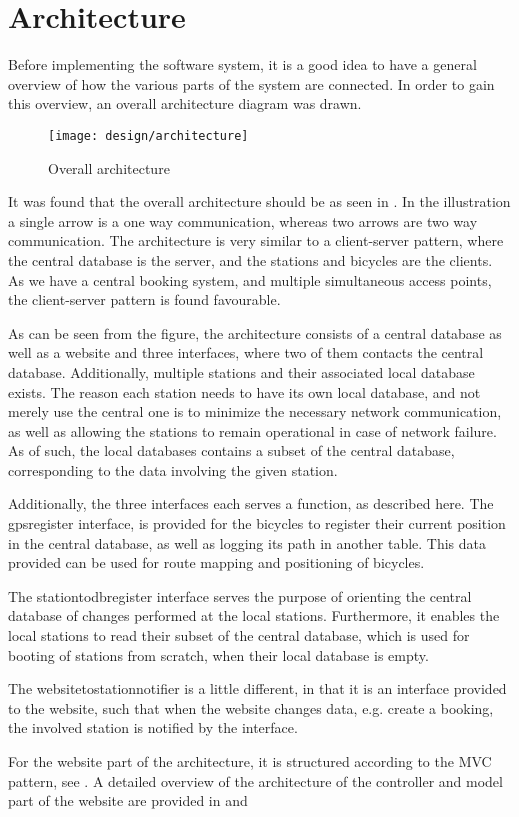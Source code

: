 \section{Architecture}
Before implementing the software system, it is a good idea to have a general overview of how the various parts of the system are connected.
In order to gain this overview, an overall architecture diagram was drawn.
\begin{figure}[h]
	\centering
	\texttt{[image: design/architecture]}
	\caption{Overall architecture}\label{fig:overallarch}
\end{figure}

It was found that the overall architecture should be as seen in .
In the illustration a single arrow is a one way communication, whereas two arrows are two way communication.
The architecture is very similar to a client-server pattern, where the central database is the server, and the stations and bicycles are the clients.
As we have a central booking system, and multiple simultaneous access points, the client-server pattern is found favourable.

As can be seen from the figure, the architecture consists of a central database as well as a website and three interfaces, where two of them contacts the central database.
Additionally, multiple stations and their associated local database exists.
The reason each station needs to have its own local database, and not merely use the central one is to minimize the necessary network communication, as well as allowing the stations to remain operational in case of network failure.
As of such, the local databases contains a subset of the central database, corresponding to the data involving the given station.

Additionally, the three interfaces each serves a function, as described here.
The gpsregister interface, is provided for the bicycles to register their current position in the central database, as well as logging its path in another table.
This data provided can be used for route mapping and positioning of bicycles.

The stationtodbregister interface serves the purpose of orienting the central database of changes performed at the local stations. Furthermore, it enables the local stations to read their subset of the central database, which is used for booting of stations from scratch, when their local database is empty.

The websitetostationnotifier is a little different, in that it is an interface provided to the website, such that when the website changes data, e.g. create a booking, the involved station is notified by the interface.

For the website part of the architecture, it is structured according to the MVC pattern, see .
A detailed overview of the architecture of the controller and model part of the website are provided in  and 


